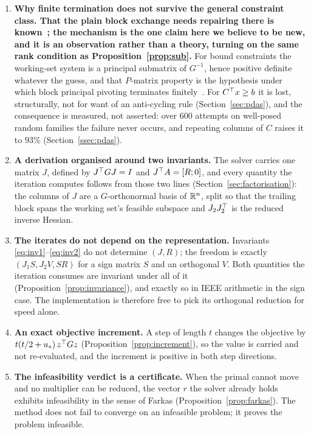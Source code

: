 \begin{enumerate}
\item \textbf{Why finite termination does not survive the general constraint
class. That the plain block exchange needs repairing there is
known~\cite{curtis2015pdas}; the mechanism is the one claim here we believe to be
new, and it is an observation rather than a theory, turning on the same rank
condition as Proposition~\ref{prop:sub}.} For bound constraints the
working-set system is a principal submatrix of $G^{-1}$, hence positive definite
whatever the guess, and that $P$-matrix property is the hypothesis under which
block principal pivoting terminates finitely~\cite{judice1994,murty1988,%
schmelzer2026nncg}. For $C^{\top} x \ge b$ it is lost, structurally, not for want
of an anti-cycling rule (Section~\ref{sec:pdas}), and the consequence is measured, not
asserted: over $600$ attempts on well-posed random families the failure
never occurs, and repeating columns of $C$ raises it to $93\%$
(Section~\ref{ssec:pdas}).

\item \textbf{A derivation organised around two invariants.} The solver carries one
matrix $J$, defined by $J^{\top} G J = I$ and $J^{\top} A = [R;0]$, and every quantity the
iteration computes follows from those two lines
(Section~\ref{sec:factorisation}): the columns of $J$ are a $G$-orthonormal basis
of $\mathbb{R}^n$, split so that the trailing block spans the working set's feasible
subspace and $J_2J_2^{\top}$ is the reduced inverse Hessian.

\item \textbf{The iterates do not depend on the representation.} Invariants
\eqref{eq:inv1}--\eqref{eq:inv2} do not determine $(J,R)$; the freedom is exactly
$(J_1S, J_2V, SR)$ for a sign matrix $S$ and an orthogonal $V$. Both quantities
the iteration consumes are invariant under all of it
(Proposition~\ref{prop:invariance}), and exactly so in IEEE arithmetic in the
sign case. The implementation is therefore free to pick its orthogonal reduction
for speed alone.

\item \textbf{An exact objective increment.} A step of length $t$ changes the
objective by $t(t/2 + u_*)\,z^{\top} G z$ (Proposition~\ref{prop:increment}), so the
value is carried and not re-evaluated, and the increment is positive in both
step directions.

\item \textbf{The infeasibility verdict is a certificate.} When the primal cannot
move and no multiplier can be reduced, the vector $r$ the solver already holds
exhibits infeasibility in the sense of Farkas
(Proposition~\ref{prop:farkas}). The method does not fail to converge on an
infeasible problem; it proves the problem infeasible.


\end{enumerate}
